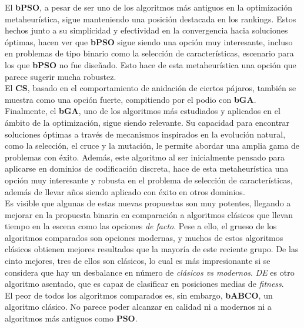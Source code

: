 El \textbf{bPSO}, a pesar de ser uno de los algoritmos más antiguos en la optimización metaheurística, sigue manteniendo una posición destacada en los rankings. Estos hechos junto a su simplicidad y efectividad en la convergencia hacia soluciones óptimas, hacen ver que \textbf{bPSO} sigue siendo una opción muy interesante, incluso en problemas de tipo binario como la selección de características, escenario para los que \textbf{bPSO} no fue diseñado. Esto hace de esta metaheurística una opción que parece sugerir mucha robustez.\\[6pt]

El \textbf{CS}, basado en el comportamiento de anidación de ciertos pájaros, también se muestra como una opción fuerte, compitiendo por el podio con \textbf{bGA}.\\[6pt]

Finalmente, el \textbf{bGA}, uno de los algoritmos más estudiados y aplicados en el ámbito de la optimización, sigue siendo relevante. Su capacidad para encontrar soluciones óptimas a través de mecanismos inspirados en la evolución natural, como la selección, el cruce y la mutación, le permite abordar una amplia gama de problemas con éxito. Además, este algoritmo al ser inicialmente pensado para aplicarse en dominios de codificación discreta, hace de esta metaheurística una opción muy interesante y robusta en el problema de selección de características, además de llevar años siendo aplicado con éxito en otros dominios.\\[6pt]

Es visible que algunas de estas nuevas propuestas son muy potentes, llegando a mejorar en la propuesta binaria en comparación a algoritmos clásicos que llevan tiempo en la escena como las opciones \textit{de facto}. Pese a ello, el grueso de los algoritmos comparados son opciones modernas, y muchos de estos algoritmos clásicos obtienen mejores resultados que la mayoría de este reciente grupo. De las cinto mejores, tres de ellos son clásicos, lo cual es más impresionante si se considera que hay un desbalance en número de \textit{clásicos vs modernos}. \textit{DE} es otro algoritmo asentado, que es capaz de clasificar en posiciones medias de \textit{fitness}.\\[6pt]

El peor de todos los algoritmos comparados es, sin embargo, \textbf{bABCO}, un algoritmo clásico. No parece poder alcanzar en calidad ni a modernos ni a algoritmos más antiguos como \textbf{PSO}.

